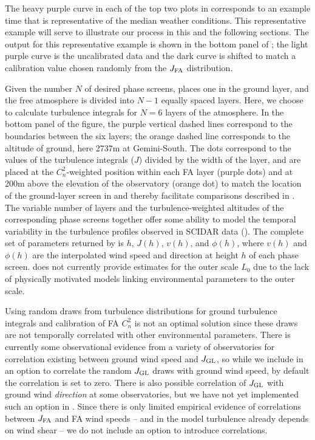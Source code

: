 \documentclass[twocolumn,twocolappendix]{openjournal}
\begin{document}
The heavy purple curve in each of the top two plots in  corresponds to an example time that is representative of the median weather conditions. 
This representative example will serve to illustrate our process in this and the following sections.
The \osborn output for this representative example is shown in the bottom panel of ; the light purple curve is the uncalibrated data and the dark curve is shifted to match a calibration value chosen randomly from the $J_{\rm FA}$ distribution.

Given the number $N$ of desired phase screens, \psfws places one in the ground layer, and the free atmosphere is divided into $N-1$ equally spaced layers.
Here, we choose to calculate turbulence integrals for $N=6$ layers of the atmosphere.
In the bottom panel of the figure, the purple vertical dashed lines correspond to the boundaries between the six layers; the orange dashed line corresponds to the altitude of ground, here 2737\unit{m} at Gemini-South.
The dots correspond to the values of the turbulence integrals ($J$) divided by the width of the layer, and are placed at the $C_n^2$-weighted position within each FA layer (purple dots) and at 200\unit{m} above the elevation of the observatory (orange dot) to match the location of the ground-layer screen in \dcii and thereby facilitate comparisons described in .
The variable number of layers and the turbulence-weighted altitudes of the corresponding phase screens together offer some ability to model the temporal variability in the turbulence profiles observed in SCIDAR data (\osborn).
The complete set of parameters returned by \psfws is $h$, $J(h)$, $v(h)$, and $\phi(h)$, where $v(h)$ and $\phi(h)$ are the interpolated wind speed and direction at height $h$ of each  phase screen.
\psfws does not currently provide estimates for the outer scale $L_0$ due to the lack of physically motivated models linking environmental parameters to the outer scale.

Using random draws from turbulence distributions for ground turbulence integrals and calibration of FA $C_n^2$ is not an optimal solution since these draws are not temporally correlated with other environmental parameters. 
There is currently some observational evidence from a variety of observatories \citep{tokovinin_statistics_2003, tokovinin_optical_2005, chun_mauna_2009} for correlation existing between ground wind speed and $J_{\rm GL}$, so while we include in \psfws an option to correlate the random $J_{\rm GL}$ draws with ground wind speed, by default the correlation is set to zero.
There is also possible correlation of $J_{\rm GL}$ with ground wind \textit{direction} \citep{tokovinin_statistics_2003} at some observatories, but we have not yet implemented such an option in \psfws. 
Since there is only limited empirical evidence of correlations between $J_{\rm FA}$ and FA wind speeds \citep{tokovinin_statistics_2003} -- and in the \osborn model turbulence already depends on wind shear -- we do not include an option to introduce correlations. 
\end{document}
